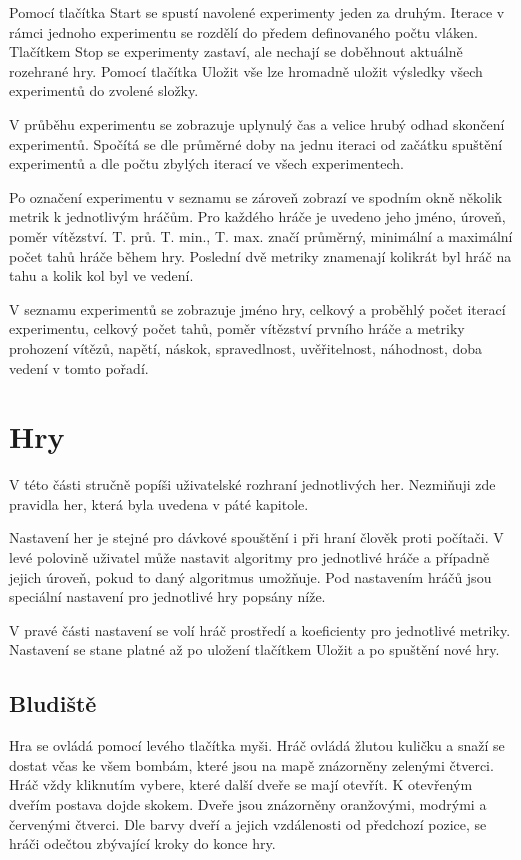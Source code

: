 Pomocí tlačítka Start se spustí navolené experimenty jeden za druhým. Iterace v rámci jednoho experimentu se rozdělí do předem definovaného počtu vláken. Tlačítkem Stop se experimenty zastaví, ale nechají se doběhnout aktuálně rozehrané hry. Pomocí tlačítka Uložit vše lze hromadně uložit výsledky všech experimentů do zvolené složky. 

V průběhu experimentu se zobrazuje uplynulý čas a velice hrubý odhad skončení experimentů. Spočítá se dle průměrné doby na jednu iteraci od začátku spuštění experimentů a dle počtu zbylých iterací ve všech experimentech.

Po označení experimentu v seznamu se zároveň zobrazí ve spodním okně několik metrik k jednotlivým hráčům. Pro každého hráče je uvedeno jeho jméno, úroveň, poměr vítězství. T. prů. T. min., T. max. značí průměrný, minimální a maximální počet tahů hráče během hry. Poslední dvě metriky znamenají kolikrát byl hráč na tahu a kolik kol byl ve vedení.

V seznamu experimentů se zobrazuje jméno hry, celkový a proběhlý počet iterací experimentu, celkový počet tahů, poměr vítězství prvního hráče a metriky prohození vítězů, napětí, náskok, spravedlnost, uvěřitelnost, náhodnost, doba vedení v tomto pořadí.

\section{Hry}

V této části stručně popíši uživatelské rozhraní jednotlivých her. Nezmiňuji zde pravidla her, která byla uvedena v páté kapitole.

Nastavení her je stejné pro dávkové spouštění i při hraní člověk proti počítači. V levé polovině uživatel může nastavit algoritmy pro jednotlivé hráče a případně jejich úroveň, pokud to daný algoritmus umožňuje. Pod nastavením hráčů jsou speciální nastavení pro jednotlivé hry popsány níže.

V pravé části nastavení se volí hráč prostředí a koeficienty pro jednotlivé metriky. Nastavení se stane platné až po uložení tlačítkem Uložit a po spuštění nové hry.

\subsection{Bludiště}

Hra se ovládá pomocí levého tlačítka myši. Hráč ovládá žlutou kuličku a snaží se dostat včas ke všem bombám, které jsou na mapě znázorněny zelenými čtverci. Hráč vždy kliknutím vybere, které další dveře se mají otevřít. K otevřeným dveřím postava dojde skokem. Dveře jsou znázorněny oranžovými, modrými a červenými čtverci. Dle barvy dveří a jejich vzdálenosti od předchozí pozice, se hráči odečtou zbývající kroky do konce hry.

